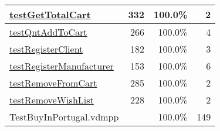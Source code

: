 \begin{longtable}{|l|r|r|r|}
\hline
\hyperref[testGetTotalCart:332]{testGetTotalCart} & 332&100.0\% & 2 \\
\hline
\hyperref[testQntAddToCart:266]{testQntAddToCart} & 266&100.0\% & 4 \\
\hline
\hyperref[testRegisterClient:182]{testRegisterClient} & 182&100.0\% & 3 \\
\hline
\hyperref[testRegisterManufacturer:153]{testRegisterManufacturer} & 153&100.0\% & 6 \\
\hline
\hyperref[testRemoveFromCart:285]{testRemoveFromCart} & 285&100.0\% & 2 \\
\hline
\hyperref[testRemoveWishList:228]{testRemoveWishList} & 228&100.0\% & 2 \\
\hline
\hline
TestBuyInPortugal.vdmpp & & 100.0\% & 149 \\
\hline
\end{longtable}


